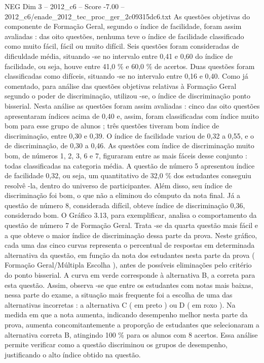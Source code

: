 \begin{textsample}{NEG Dim 3 – 2012\_c6 – Score -7.00 – 2012\_c6/enade\_2012\_tec\_proc\_ger\_2c09315dc6.txt}
As questões objetivas do componente de Formação Geral, segundo o índice de facilidade, foram assim avaliadas : das oito questões, nenhuma teve o índice de facilidade classificado como muito fácil, fácil ou muito difícil.
Seis questões foram consideradas de dificuldade média, situando -se no intervalo entre 0,41 e 0,60 do índice de facilidade, ou seja, houve entre 41,0 \% e 60,0 \% de acertos.
Duas questões foram classificadas como difíceis, situando -se no intervalo entre 0,16 e 0,40.
Como já comentado, para análise das questões objetivas relativas à Formação Geral segundo o poder de discriminação, utilizou -se, o índice de discriminação ponto bisserial.
Nesta análise as questões foram assim avaliadas : cinco das oito questões apresentaram índices acima de 0,40 e, assim, foram classificadas com índice muito bom para esse grupo de alunos ; três questões tiveram bom índice de discriminação, entre 0,30 e 0,39.
O índice de facilidade variou de 0,32 a 0,55, e o de discriminação, de 0,30 a 0,46.
As questões com índice de discriminação muito bom, de números 1, 2, 3, 6 e 7, figuraram entre as mais fáceis desse conjunto : todas classificadas na categoria média.
A questão de número 5 apresentou índice de facilidade 0,32, ou seja, um quantitativo de 32,0 \% dos estudantes conseguiu resolvê -la, dentro do universo de participantes.
Além disso, seu índice de discriminação foi bom, o que não a eliminou do cômputo da nota final.
Já a questão de número 8, considerada difícil, obteve índice de discriminação 0,36, considerado bom.
O Gráfico 3.13, para exemplificar, analisa o comportamento da questão de número 7 de Formação Geral.
Trata -se da quarta questão mais fácil e a que obteve o maior índice de discriminação dessa parte da prova.
Neste gráfico, cada uma das cinco curvas representa o percentual de respostas em determinada alternativa da questão, em função da nota dos estudantes nesta parte da prova ( Formação Geral/Múltipla Escolha ), antes de possíveis eliminações pelo critério do ponto bisserial.
A curva em verde corresponde à alternativa B, a correta para esta questão.
Assim, observa -se que entre os estudantes com notas mais baixas, nessa parte do exame, a situação mais frequente foi a escolha de uma das alternativas incorretas : a alternativa C ( em preto ) ou D ( em roxo ).
Na medida em que a nota aumenta, indicando desempenho melhor nesta parte da prova, aumenta concomitantemente a proporção de estudantes que selecionaram a alternativa correta B, atingindo 100 \% para os alunos com 8 acertos.
Essa análise permite verificar como a questão discriminou os grupos de desempenho, justificando o alto índice obtido na questão.

\end{textsample}
